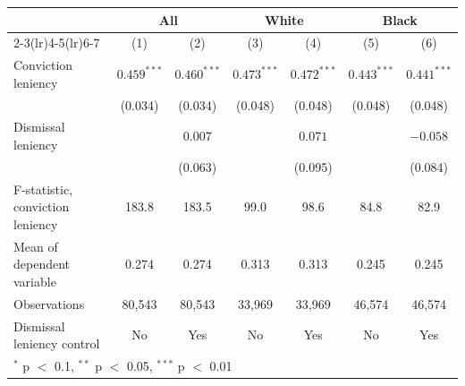 \begin{tabular}{lcccccc}
\toprule
 & \multicolumn{2}{c}{All} & \multicolumn{2}{c}{White} & \multicolumn{2}{c}{Black} \\
\cmidrule(lr){2-3}\cmidrule(lr){4-5}\cmidrule(lr){6-7}
 & (1) & (2) & (3) & (4) & (5) & (6) \\
\midrule
Conviction leniency & $0.459^{***}$ & $0.460^{***}$ & $0.473^{***}$ & $0.472^{***}$ & $0.443^{***}$ & $0.441^{***}$ \\
 & (0.034) & (0.034) & (0.048) & (0.048) & (0.048) & (0.048) \\
Dismissal leniency &  & $0.007$ &  & $0.071$ &  & $-0.058$ \\
 &  & (0.063) &  & (0.095) &  & (0.084) \\
\midrule
F-statistic, conviction leniency & 183.8 & 183.5 & 99.0 & 98.6 & 84.8 & 82.9 \\
Mean of dependent variable & 0.274 & 0.274 & 0.313 & 0.313 & 0.245 & 0.245 \\
Observations & 80,543 & 80,543 & 33,969 & 33,969 & 46,574 & 46,574 \\
Dismissal leniency control & No & Yes & No & Yes & No & Yes \\
\bottomrule
\multicolumn{7}{l}{\footnotesize $^{*}$ p $<$ 0.1, $^{**}$ p $<$ 0.05, $^{***}$ p $<$ 0.01} \\
\end{tabular}
